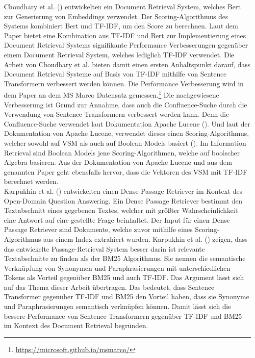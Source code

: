 Choudhary et al. (\citeyear{Choudhary_Guttikonda_Chowdhury_Learmonth_2020}) entwickelten ein Document Retrieval System, welches Bert zur Generierung von Embeddings verwendet.
Der Scoring-Algorithmus des Systems kombiniert Bert und TF-IDF, um den Score zu berechnen.
Laut dem Paper bietet eine Kombination aus TF-IDF und Bert zur Implementierung eines Document Retrieval Systems signifikante Performance Verbesserungen gegenüber einem Document Retrieval System, welches lediglich TF-IDF verwendet.
Die Arbeit von Choudhary et al. bieten damit einen ersten Anhaltspunkt darauf, dass Document Retrieval Systeme auf Basis von TF-IDF mithilfe von Sentence Transformern verbessert werden können.
Die Performance Verbesserung wird in dem Paper an dem MS Marco Datensatz gemessen.\footnote{\url{https://microsoft.github.io/msmarco/}}
Die nachgewiesene Verbesserung ist Grund zur Annahme, dass auch die Confluence-Suche durch die Verwendung von Sentence Transformern verbessert werden kann.
Denn die Confluence-Suche verwendet laut Dokumentation Apache Lucene (\cite{Confluence_Ranking}).
Und laut der Dokumentation von Apache Lucene, verwendet dieses einen Scoring-Algorithmus, welcher sowohl auf VSM als auch auf Boolean Models basiert (\cite{Lucene_Scoring}).
Im Information Retrieval sind Boolean Models jene Scoring-Algorithmen, welche auf boolscher Algebra basieren.
Aus der Dokumentation von Apache Lucene und aus dem genannten Paper geht ebensfalls hervor, dass die Vektoren des VSM mit TF-IDF berechnet werden.\\

Karpukhin et al. (\citeyear{Karpukhin_Oguz_Min_Lewis_Wu_Edunov_Chen_Yih_2020}) entwickelten einen Dense-Passage Retriever im Kontext des Open-Domain Question Answering.
Ein Dense Passage Retriever bestimmt den Textabschnitt eines gegebenen Textes, welcher mit größter Wahrscheinlichkeit eine Antwort auf eine gestellte Frage beinhaltet.
Der Input für einen Dense Passage Retriever sind Dokumente, welche zuvor mithilfe eines Scoring-Algorithmus aus einem Index extrahiert wurden.
Karpukhin et al. (\citeyear{Karpukhin_Oguz_Min_Lewis_Wu_Edunov_Chen_Yih_2020}) zeigen, dass das entwickelte Passage-Retrieval System besser darin ist relevante Textabschnitte zu finden als der BM25 Algorithmus. 
Sie nennen die semantische Verknüpfung von Synonymen und Paraphrasierungen mit unterschiedlichen Tokens als Vorteil gegenüber BM25 und auch TF-IDF.
Das Argument lässt sich auf das Thema dieser Arbeit übertragen.
Das bedeutet, dass Sentence Transformer gegenüber TF-IDF und BM25 den Vorteil haben, dass sie Synonyme und Paraphrasierungen semantisch verknüpfen können.
Damit lässt sich die bessere Performance von Sentence Transformern gegenüber TF-IDF und BM25 im Kontext des Document Retrieval begründen.\\

